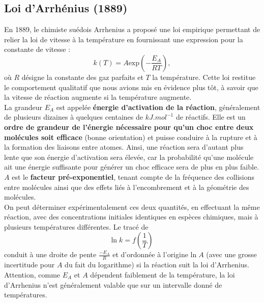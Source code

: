 \documentclass[11pt,a4paper]{report}
\begin{document}
\subsection{Loi d'Arrhénius (1889)}

En 1889, le chimiste suédois Arrhenius a proposé une loi empirique permettant de relier la loi de vitesse à la température en fournissant une expression pour la constante de vitesse :
\begin{equation}
	k(T) = A\text{exp}\left(-\frac{E_A}{RT}\right),
\end{equation}
où $R$ désigne la constante des gaz parfaits et $T$ la température. Cette loi restitue le comportement qualitatif que nous avions mis en évidence plus tôt, à savoir que la vitesse de réaction augmente si la température augmente.\\

La grandeur $E_A$ est appelée \textbf{énergie d'activation de la réaction}, généralement de plusieurs dizaines à quelques centaines de $kJ.mol^{-1}$ de réactifs. Elle est un \textbf{ordre de grandeur de l'énergie nécessaire pour qu'un choc entre deux molécules soit efficace} (bonne orientation) et puisse conduire à la rupture et à la formation des liaisons entre atomes. Ainsi, une réaction sera d'autant plus lente que son énergie d'activation sera élevée, car la probabilité qu'une molécule ait une énergie suffisante pour générer un choc efficace sera de plus en plus faible.\\

$A$ est le \textbf{facteur pré-exponentiel}, tenant compte de la fréquence des collisions entre molécules ainsi que des effets liés à l'encombrement et à la géométrie des molécules.\\

On peut déterminer expérimentalement ces deux quantités, en effectuant la même réaction, avec des concentrations initiales identiques en espèces chimiques, mais à plusieurs températures différentes. Le tracé de 
\begin{equation}
	\text{ln}\;k = f\left(\frac{1}{T}\right)
\end{equation}
conduit à une droite de pente $\frac{-E_A}{R}$ et d'ordonnée à l'origine $\text{ln}\;A$ (avec une grosse incertitude pour $A$ du fait du logarithme) si la réaction suit la loi d'Arrhenius. Attention, comme $E_A$ et $A$ dépendent faiblement de la température, la loi d'Arrhenius n'est généralement valable que sur un intervalle donné de températures.\\
\end{document}
